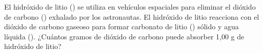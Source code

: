 El hidróxido de litio () se utiliza en vehículos espaciales para eliminar el dióxido de carbono () exhalado por los astronautas. El hidróxido de litio reacciona con el dióxido de carbono gaseoso para formar carbonato de litio () sólido y agua líquida (). ¿Cuántos gramos de dióxido de carbono puede absorber 1,00 g de hidróxido de litio?             

